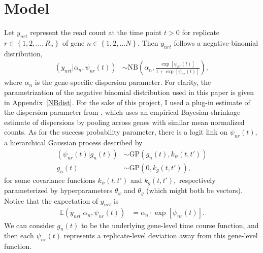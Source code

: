 \documentclass[11pt]{article}
\newcommand{\1}{\mathbf{1}}
\newcommand{\0}{\mathbf{0}}
\begin{document}

\section{Model}\label{Model}

Let $y_{nrt}$ represent the read count at the time point $t > 0$ for replicate $r \in \left\{ 1, 2, \ldots, R_n \right\}$ of gene $n \in \left\{ 1,2,\ldots N \right\}$. Then $y_{nrt}$ follows a negative-binomial distribution, 
%
%
%
\begin{align*}
	(y_{nrt} | \alpha_{n}, \psi_{nr}(t)) &\sim \text{NB}\left( \alpha_{n} , \frac{\exp\left[ \psi_{nr}(t) \right]}{1 + \exp\left[ \psi_{nr}(t) \right]} \right),
\end{align*}
%
%
%
where $\alpha_n$ is the gene-specific dispersion parameter. For clarity, the parametrization of the negative binomial distribution used in this paper is given in Appendix~\ref{NBdist}. For the sake of this project, I used a plug-in estimate of the dispersion parameter from \cite{DESeq2}, which uses an empirical Bayesian shrinkage estimate of dispersions by pooling across genes with similar mean normalized counts. As for the success probability parameter, there is a logit link on $\psi_{nr}(t),$ a hierarchical Gaussian process described by
%
%
\begin{align*}
	(\psi_{nr}(t) | g_n(t)) &\sim \text{GP}(g_n(t), k_\psi(t, t')) \\
	g_n(t) &\sim \text{GP}(0, k_g(t, t')),
\end{align*}
%
%
%
for some covariance functions $k_\psi(t, t')$ and $k_g(t, t'),$ respectively parameterized by hyperparameters $\theta_\psi$ and $\theta_g$ (which might both be vectors). Notice that the expectation of $y_{nrt}$ is 
%
%
\begin{align}
	\mathbb{E}(y_{nrt} | \alpha_n, \psi_{nr}(t)) &= \alpha_{n} \cdot \exp\left[ \psi_{nr}(t) \right]. \label{expectation}
\end{align} 
%
%
%
We can consider $g_n(t)$ to be the underlying gene-level time course function, and then each $\psi_{nr}(t)$ represents a replicate-level deviation away from this gene-level function.


\end{document}
